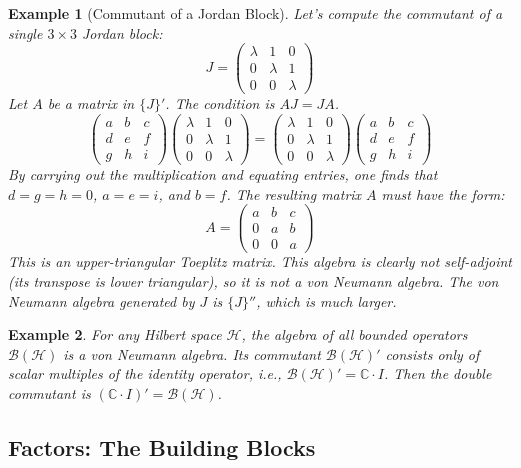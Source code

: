 \documentclass[11pt, a4paper]{article}
\theoremstyle{colored_def}
\theoremstyle{colored_thm}
\theoremstyle{colored_ex}
\newtheorem{example}{Example}[section]
\newcommand{\C}{\mathbb{C}}
\newcommand{\Hil}{\mathcal{H}}
\newcommand{\B}{\mathcal{B}}
\begin{document}
\begin{example}[Commutant of a Jordan Block]\label{ex:commutant-jordan}
Let's compute the commutant of a single $3 \times 3$ Jordan block:
$$ J = \begin{pmatrix} \lambda & 1 & 0 \\ 0 & \lambda & 1 \\ 0 & 0 & \lambda \end{pmatrix} $$
Let $A$ be a matrix in $\{J\}'$. The condition is $AJ=JA$.
$$ \begin{pmatrix} a & b & c \\ d & e & f \\ g & h & i \end{pmatrix} \begin{pmatrix} \lambda & 1 & 0 \\ 0 & \lambda & 1 \\ 0 & 0 & \lambda \end{pmatrix} = \begin{pmatrix} \lambda & 1 & 0 \\ 0 & \lambda & 1 \\ 0 & 0 & \lambda \end{pmatrix} \begin{pmatrix} a & b & c \\ d & e & f \\ g & h & i \end{pmatrix} $$
By carrying out the multiplication and equating entries, one finds that $d=g=h=0$, $a=e=i$, and $b=f$. The resulting matrix $A$ must have the form:
$$ A = \begin{pmatrix} a & b & c \\ 0 & a & b \\ 0 & 0 & a \end{pmatrix} $$
This is an upper-triangular Toeplitz matrix. This algebra is clearly not self-adjoint (its transpose is lower triangular), so it is not a von Neumann algebra. The von Neumann algebra generated by $J$ is $\{J\}''$, which is much larger.
\end{example}

\begin{example}
For any Hilbert space $\Hil$, the algebra of all bounded operators $\B(\Hil)$ is a von Neumann algebra. Its commutant $\B(\Hil)'$ consists only of scalar multiples of the identity operator, i.e., $\B(\Hil)' = \C \cdot I$. Then the double commutant is $(\C \cdot I)' = \B(\Hil)$.
\end{example}

\subsection{Factors: The Building Blocks}
\end{document}
